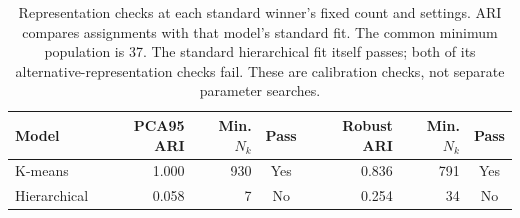 \begin{table}[htbp]
\centering
\footnotesize
\begin{tabularx}{\textwidth}{@{}Xrrcrrc@{}}
\toprule
Model & PCA95 ARI & Min. $N_k$ & Pass & Robust ARI & Min. $N_k$ & Pass\\
\midrule
K-means & 1.000 & 930 & Yes & 0.836 & 791 & Yes\\
Hierarchical & 0.058 & 7 & No & 0.254 & 34 & No\\
\bottomrule
\end{tabularx}
\caption{Representation checks at each standard winner's fixed count and settings. ARI compares assignments with that model's standard fit. The common minimum population is 37. The standard hierarchical fit itself passes; both of its alternative-representation checks fail. These are calibration checks, not separate parameter searches.}
\label{tab:fixed11-sensitivity}
\end{table}
